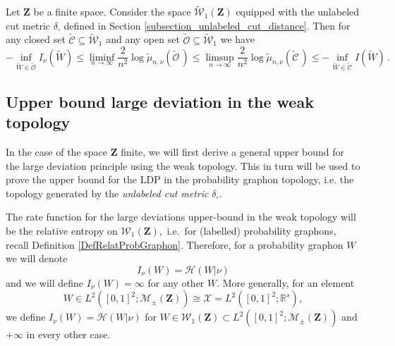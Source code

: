 \documentclass[12pt,twoside,a4paper]{article}
\newcommand{\Space}{\mathbf{Z}}
\newcommand{\Graphon}{\mathcal{W}_1}
\newcommand{\UGraphon}{\widetilde{\mathcal{W}}_1}
\begin{document}
\begin{theorem}\label{thm:LDP}
Let $\Space$ be a finite space. Consider the space $\UGraphon(\Space)$ equipped with the unlabeled cut metric $\delta_\square$ defined in Section \ref{subsection_unlabeled_cut_distance}. Then for any closed set $\widetilde{\mathcal{C}} \subseteq \widetilde{\mathcal{W}}_1$ and any open set $\widetilde{\mathcal{O}} \subseteq \widetilde{\mathcal{W}}_1$ we have
\[
-\inf_{\widetilde{W} \in \widetilde{\mathcal{O}}} I_\nu(\widetilde{W})\leq\liminf_{n \to \infty} \frac{2}{n^2} \log \widetilde{\mu}_{n,\nu}(\widetilde{\mathcal{O}}\,)\leq\limsup_{n \to \infty} \frac{2}{n^2} \log \widetilde{\mu}_{n,\nu}(\widetilde{\mathcal{C}}\,) \leq -\inf_{\widetilde{W} \in \widetilde{\mathcal{C}}} I(\widetilde{W}) \,.
\]
\end{theorem}
\subsection{Upper bound large deviation in the weak topology}

In the case of the space $\Space$ finite, we will first derive a general upper bound for the large deviation principle using the weak topology. This in turn will be used to prove the upper bound for the LDP in the probability graphon topology, i.e. the topology generated by the \emph{unlabeled cut metric} $\delta_{\square}$. 

The rate function for the large deviations upper-bound in the weak topology will be the relative entropy on $\Graphon(\Space),$ i.e.\ for (labelled) probability graphons, recall Definition \ref{DefRelatProbGraphon}. Therefore, for a probability graphon $W$ we will denote \begin{equation}\label{Eq:RateFuncRelEnt}
    I_{\nu}(W)=\mathcal{H}(W|\nu)
\end{equation}
and we will define $I_{\nu}(W)=\infty$ for any other $W.$ More generally, for an element 
\[
W\in L^2([0,1]^2;\mathcal{M}_{\pm}(\Space))\cong\mathcal{X}= L^2([0,1]^2;\mathbb{R}^s),
\]
we define $I_{\nu}(W)=\mathcal{H}(W|\nu)$ for $W\in \Graphon(\Space)\subset L^2([0,1]^2;\mathcal{M}_{\pm}(\Space))$ and $+\infty$ in every other case.
\end{document}
